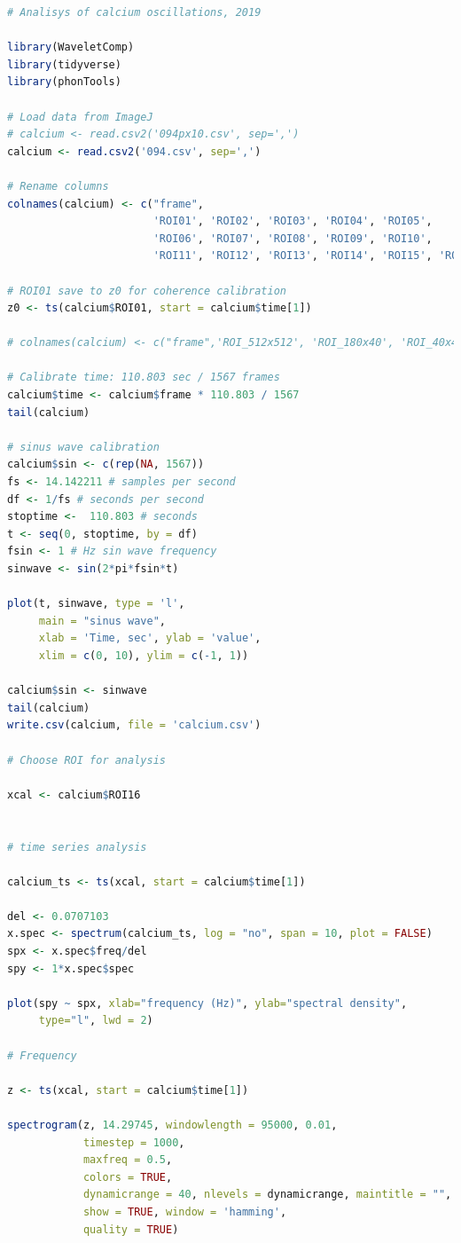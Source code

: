 \documentclass{biophys-new}
\begin{document}
\begin{lstlisting}[language=R]
# Analisys of calcium oscillations, 2019

library(WaveletComp)
library(tidyverse)
library(phonTools)

# Load data from ImageJ
# calcium <- read.csv2('094px10.csv', sep=',')
calcium <- read.csv2('094.csv', sep=',')

# Rename columns
colnames(calcium) <- c("frame",
                       'ROI01', 'ROI02', 'ROI03', 'ROI04', 'ROI05',
                       'ROI06', 'ROI07', 'ROI08', 'ROI09', 'ROI10',
                       'ROI11', 'ROI12', 'ROI13', 'ROI14', 'ROI15', 'ROI16')

# ROI01 save to z0 for coherence calibration
z0 <- ts(calcium$ROI01, start = calcium$time[1])

# colnames(calcium) <- c("frame",'ROI_512x512', 'ROI_180x40', 'ROI_40x40', 'ROI_10x10')

# Calibrate time: 110.803 sec / 1567 frames
calcium$time <- calcium$frame * 110.803 / 1567
tail(calcium)

# sinus wave calibration
calcium$sin <- c(rep(NA, 1567))
fs <- 14.142211 # samples per second
df <- 1/fs # seconds per second
stoptime <-  110.803 # seconds
t <- seq(0, stoptime, by = df)
fsin <- 1 # Hz sin wave frequency
sinwave <- sin(2*pi*fsin*t)

plot(t, sinwave, type = 'l',
     main = "sinus wave",
     xlab = 'Time, sec', ylab = 'value',
     xlim = c(0, 10), ylim = c(-1, 1))

calcium$sin <- sinwave
tail(calcium)
write.csv(calcium, file = 'calcium.csv')

# Choose ROI for analysis

xcal <- calcium$ROI16


# time series analysis

calcium_ts <- ts(xcal, start = calcium$time[1])

del <- 0.0707103
x.spec <- spectrum(calcium_ts, log = "no", span = 10, plot = FALSE)
spx <- x.spec$freq/del
spy <- 1*x.spec$spec

plot(spy ~ spx, xlab="frequency (Hz)", ylab="spectral density",
     type="l", lwd = 2)

# Frequency

z <- ts(xcal, start = calcium$time[1])

spectrogram(z, 14.29745, windowlength = 95000, 0.01,
            timestep = 1000,
            maxfreq = 0.5,
            colors = TRUE,
            dynamicrange = 40, nlevels = dynamicrange, maintitle = "",
            show = TRUE, window = 'hamming',
            quality = TRUE)


\end{lstlisting}
\end{document}
